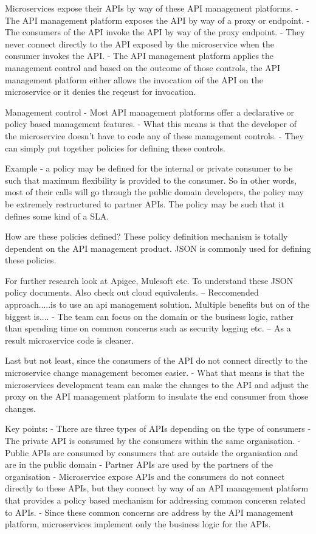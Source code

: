 Microservices expose their APIs by way of these API management platforms.
- The API management platform exposes the API by way of a proxy or endpoint.
- The consumers of the API invoke the API by way of the proxy endpoint.
- They never connect directly to the API exposed by the microservice when the consumer invokes the API.
- The API management platform applies the management control and based on the outcome of those controls, the API management platform either allows the invocation oif the API on the microservice or it denies the reqeust for invocation.

Management control
- Most API management platforms offer a declarative or policy based management features.
- What this means is that the developer of the microservice doesn't have to code any of these management controls.
- They can simply put together policies for defining these controls.

Example - a policy may be defined for the internal or private consumer to be such that maximum flexibility is provided to the consumer.
So in other words, most of their calls will go through the public domain developers, the policy may be extremely restructured to partner APIs.
The policy may be such that it defines some kind of a SLA.

How are these policies defined?
These policy definition mechanism is totally dependent on the API management product.
JSON is commonly used for defining these policies.

For further research look at Apigee, Mulesoft etc.
To understand these JSON policy documents. Also check out cloud equivalents.
-- Reccomended approach.....is to use an api management solution.
Multiple benefits but on of the biggest is....
- The team can focus on the domain or the business logic, rather than spending time on common concerns such as security logging etc.
-- As a result microservice code is cleaner.

Last but not least, since the consumers of the API do not connect directly to the microservice change management becomes easier.
- What that means is that the microservices development team can make the changes to the API and adjust the proxy on the API management platform to insulate the end consumer from those changes.

Key points:
- There are three types of APIs depending on the type of consumers
- The private API is consumed by the consumers within the same organisation.
- Public APIs are consumed by consumers that are outside the organisation and are in the public domain
- Partner APIs are used by the partners of the organisation
- Microservice expose APIs and the consumers do not connect directly to these APIs, but they connect by way of an API management platform that provides a policy based mechanism for addressing common concersn related to APIs.
- Since these common concerns are address by the API management platform, microservices implement only the business logic for the APIs.

